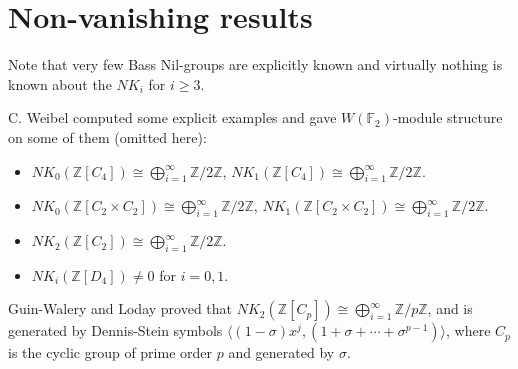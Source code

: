 \section{Non-vanishing results} %
\label{sec:non_vanishing_results}
Note that very few Bass Nil-groups are explicitly known and virtually nothing is known about the $NK_i$ for $i\geq 3$.

C. Weibel\cite{weibel2009nk0} computed some explicit examples and gave $W(\mathbb{F}_2)$-module structure on some of them (omitted here):
\begin{itemize}
	\item $NK_0(\mathbb{Z}[C_4])\cong \bigoplus_{i=1}^\infty \mathbb{Z}/2\mathbb{Z}$, $NK_1(\mathbb{Z}[C_4])\cong \bigoplus_{i=1}^\infty \mathbb{Z}/2\mathbb{Z}$.
	\item $NK_0(\mathbb{Z}[C_2\times C_2])\cong \bigoplus_{i=1}^\infty \mathbb{Z}/2\mathbb{Z}$, $NK_1(\mathbb{Z}[C_2\times C_2])\cong \bigoplus_{i=1}^\infty \mathbb{Z}/2\mathbb{Z}$.
	\item $NK_2(\mathbb{Z}[C_2])\cong \bigoplus_{i=1}^\infty \mathbb{Z}/2\mathbb{Z}$.
	\item $NK_i(\mathbb{Z}[D_4])\neq 0$ for $i=0,1$.
\end{itemize}

Guin-Walery and Loday\cite{Guin-Waléry1981} proved that $NK_2(\mathbb{Z}[C_p])\cong \bigoplus_{i=1}^\infty \mathbb{Z}/p\mathbb{Z}$, and is generated by Dennis-Stein symbols $\langle (1-\sigma)x^j,(1+\sigma+\cdots+\sigma^{p-1})\rangle$, where $C_p$ is the cyclic group of prime order $p$ and generated by $\sigma$.

